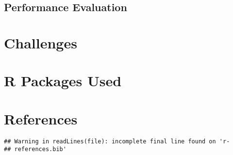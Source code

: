 \documentclass[floatsintext,man]{apa6}
\theoremstyle{definition}
\theoremstyle{definition}
\theoremstyle{definition}
\theoremstyle{remark}
\begin{document}
\subsection{Performance Evaluation}\label{performance-evaluation}

\section{Challenges}\label{challenges}

\newpage

\section{R Packages Used}\label{r-packages-used}

\newpage

\section{References}\label{references}

\begin{verbatim}
## Warning in readLines(file): incomplete final line found on 'r-
## references.bib'
\end{verbatim}

\begingroup
\setlength{\parindent}{-0.5in} \setlength{\leftskip}{0.5in}

\hypertarget{refs}{}

\endgroup



\clearpage
\renewcommand{\listfigurename}{Figure captions}
\listoffigures
\end{document}
